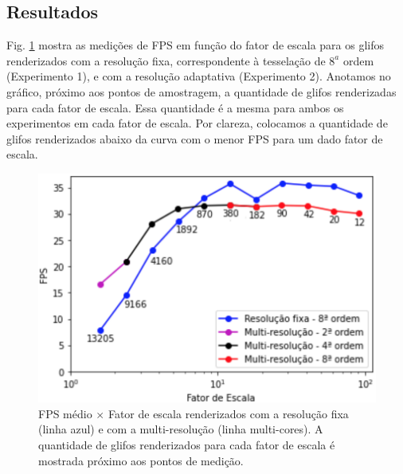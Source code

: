 

\subsection{Resultados}
\label{ssec::reais_resultados}



Fig. \ref{fig::fps_fatorescala} mostra as medições de FPS em função do fator de escala para os glifos renderizados com a resolução fixa, correspondente à tesselação de $8^a$  ordem (Experimento 1), e com a resolução adaptativa (Experimento 2). Anotamos no gráfico, próximo aos pontos de amostragem, a quantidade de glifos renderizadas para cada fator de escala. Essa quantidade é a mesma para ambos os experimentos em cada fator de escala. Por clareza, colocamos a quantidade de glifos renderizados abaixo da curva com o menor FPS para um dado fator de escala.

\begin{figure}[H]
    \centering
    \includegraphics[width=.65\linewidth, angle=0]{figs/Esquema_Glifo/Visual/FPS_fator_de_escala_legendado_2.png}
    \caption{FPS médio $\times$ Fator de escala renderizados com a resolução fixa (linha azul) e com a multi-resolução (linha multi-cores). A quantidade de glifos renderizados para cada fator de escala é mostrada próximo aos pontos de medição.}
    \label{fig::fps_fatorescala}
\end{figure}

